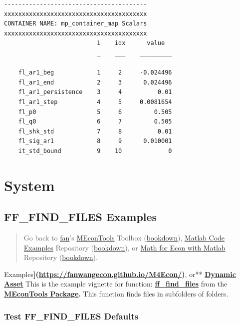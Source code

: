 \documentclass[
]{book}
\begin{document}
\begin{verbatim}
----------------------------------------
xxxxxxxxxxxxxxxxxxxxxxxxxxxxxxxxxxxxxxxx
CONTAINER NAME: mp_container_map Scalars
xxxxxxxxxxxxxxxxxxxxxxxxxxxxxxxxxxxxxxxx
                          i    idx      value  
                          _    ___    _________

    fl_ar1_beg            1     2     -0.024496
    fl_ar1_end            2     3      0.024496
    fl_ar1_persistence    3     4          0.01
    fl_ar1_step           4     5     0.0081654
    fl_p0                 5     6         0.505
    fl_q0                 6     7         0.505
    fl_shk_std            7     8          0.01
    fl_sig_ar1            8     9      0.010001
    it_std_bound          9    10             0
\end{verbatim}

\hypertarget{system}{%
\chapter{System}\label{system}}

\hypertarget{ff_find_files-examples}{%
\section{FF\_FIND\_FILES Examples}\label{ff_find_files-examples}}

\begin{quote}
Go back to \href{http://fanwangecon.github.io/}{fan}'s \href{https://fanwangecon.github.io/MEconTools/}{MEconTools} Toolbox (\href{https://fanwangecon.github.io/MEconTools/bookdown}{bookdown}), \href{https://fanwangecon.github.io/M4Econ/}{Matlab Code Examples} Repository (\href{https://fanwangecon.github.io/M4Econ/bookdown}{bookdown}), or \href{https://fanwangecon.github.io/Math4Econ/}{Math for Econ with Matlab} Repository (\href{https://fanwangecon.github.io/Math4Econ/bookdown}{bookdown}).
\end{quote}

Examples\textbf{{]}(\url{https://fanwangecon.github.io/M4Econ/})}, or** \href{https://fanwangecon.github.io/CodeDynaAsset/}{\textbf{Dynamic
Asset}}
This is the example vignette for function:
\href{https://github.com/FanWangEcon/MEconTools/blob/master/MEconTools/sys/ff_find_files.m}{\textbf{ff\_find\_files}}
from the \href{https://fanwangecon.github.io/MEconTools/}{\textbf{MEconTools
Package}}\textbf{.} This function
finds files in subfolders of folders.

\hypertarget{test-ff_find_files-defaults}{%
\subsection{Test FF\_FIND\_FILES Defaults}\label{test-ff_find_files-defaults}}
\end{document}
